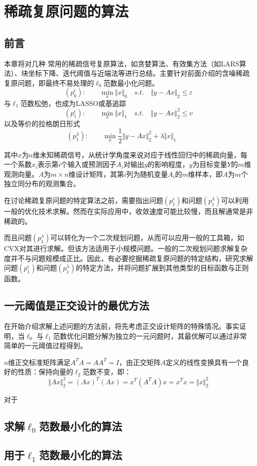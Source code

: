 \chapter{稀疏复原问题的算法}\label{chap:srt03:algorithms}

\section{前言}
 
本章将对几种 常用的稀疏信号复原算法，如贪婪算法、有效集方法（如LARS算法）、块坐标下降、迭代阈值与近端法等进行总结。主要针对前面介绍的含噪稀疏复原问题，即最终不易处理的$ \ell_0 $范数最小化问题。
\begin{equation}\label{key}
(p_{0}^{\epsilon}):\qquad \min_{x}\Vert x\Vert_0\quad s.t.\quad\Vert y-Ax\Vert_2\leq \varepsilon
\end{equation}
与$ \ell_1 $范数松弛，也成为LASSO或基追踪
\begin{equation*}\label{key}
(p_{1}^{\epsilon}):\qquad \min_{x}\Vert x\Vert_1\quad s.t.\quad\Vert y-Ax\Vert_2^2\leq v
\end{equation*}
以及等价的拉格朗日形式
\begin{equation}\label{key}
(p_{1}^{\lambda}):\qquad \min_{x} \dfrac{1}{2}\Vert y-Ax\Vert_2^2 + \lambda \Vert x\Vert_1 \qquad
\end{equation}

其中$ x $为$ n $维未知稀疏信号，从统计学角度来说对应于线性回归中的稀疏向量，每一个系数$ x_i $表示第$ i $个输入或预测因子$ A_i $对输出$ y $的影响程度，$ y $为目标变量$ Y $的$ m $维观测向量。$ A $为$ m\times n $维设计矩阵，其第$ i $列为随机变量$ A_i $的$ m $维样本，即$ A $为$ m $个独立同分布的观测集合。


在讨论稀疏复原问题的特定算法之前，需要指出问题$(p_{1}^{\epsilon})  $和问题$ (p_{1}^{\lambda}) $可以利用一般的优化技术求解。然而在实际应用中，收敛速度可能比较慢，而且解通常是非稀疏的。

而且问题$ (p_{1}^{\lambda}) $可以转化为一个二次规划问题，从而可以应用一般的工具箱，如CVX对其进行求解。但该方法适用于小规模问题。一般的二次规划问题求解复杂度并不与问题规模成正比。因此，{\heiti 有必要挖掘稀疏复原问题的特定结构，研究求解问题$(p_{1}^{\epsilon})  $和问题$ (p_{1}^{\lambda}) $的特定方法，并将问题扩展到其他类型的目标函数与正则函数。}

\section{一元阈值是正交设计的最优方法}
在开始介绍求解上述问题的方法前，将先考虑正交设计矩阵的特殊情况。事实证明，当$\ell_0$ 与$\ell_1$范数优化问题分解为独立的一元问题时，其最优解可以通过非常简单的一元阈值过程得到。

$ n $维正交标准矩阵满足$ A^T A =AA^T=I$，由正交矩阵$ A $定义的线性变换具有一个良好的性质：保持向量的$ \ell_2 $范数不变，即：
$$  \Vert Ax \Vert_2^2 = (Ax)^T(Ax) =x^T(A^TA)x = x^Tx = \Vert x \Vert_2^2$$

对于$  $

\section{求解$ \ell_0 $范数最小化的算法}




\section{用于$ \ell_1 $范数最小化的算法}